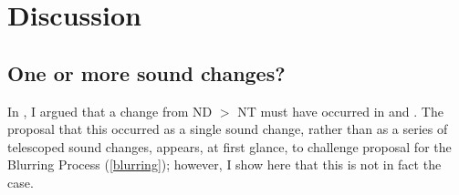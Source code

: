 \documentclass[output=paper,hidelinks]{langscibook}
\begin{document}
\section{Discussion}
\subsection{One or more sound changes?}\label{sec:lapierre:4.1}

In , I argued that a change from ND $>$ NT must have occurred in  and . The proposal that this occurred as a single sound change, rather than as a series of telescoped sound changes, appears, at first glance, to challenge  proposal for the Blurring Process (\ref{blurring}); however, I show here that this is not in fact the case.
\end{document}
